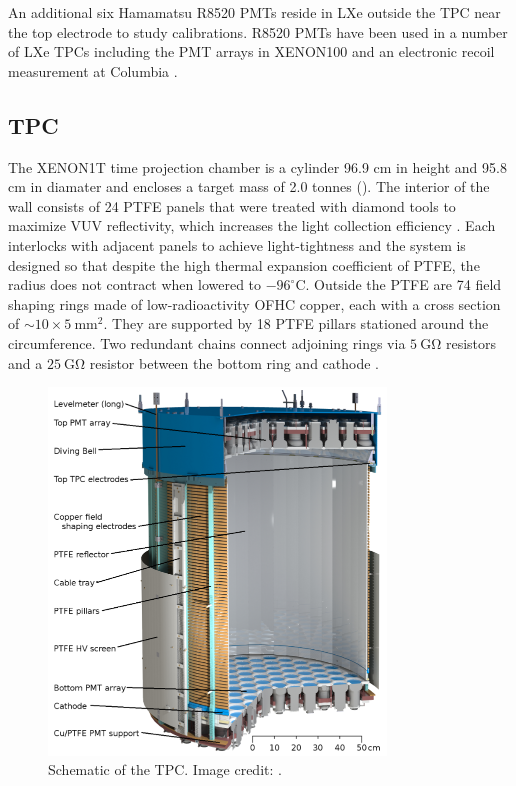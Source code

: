 An additional six Hamamatsu R8520 PMTs reside in LXe outside the TPC near the top electrode to study calibrations.  R8520 PMTs
have been used in a number of LXe TPCs including the PMT arrays in XENON100 and an electronic recoil measurement at
Columbia .




\subsection{TPC}
\label{subsec:xenon1t_tpc}
The XENON1T time projection chamber is a cylinder 96.9 cm in height and 95.8 cm in diamater and encloses a target mass of 2.0 tonnes
().  The interior of the wall consists of 24 PTFE panels that were treated with diamond tools to
maximize VUV reflectivity, which increases the light collection efficiency .  Each interlocks with adjacent panels
to achieve light-tightness and the system is designed so that despite the high thermal expansion coefficient of PTFE, the radius does not
contract when lowered to $-96^{\circ}\mathrm{C}$.  Outside the PTFE are 74
field shaping rings made of low-radioactivity OFHC copper, each with a cross section of ${\sim} 10 \times 5\ \mathrm{mm^{2}}$.  They are
supported by 18 PTFE pillars stationed around the circumference.  Two redundant
chains connect adjoining rings via $5\ \mathrm{G \Omega}$ resistors and a $25\ \mathrm{G \Omega}$ resistor between the bottom ring and
cathode .

\begin{figure}
\centering
\includegraphics[width=0.8\textwidth]{XENON1TTPC}
\caption{Schematic of the TPC.  Image credit: .}
\label{fig:xenon1t_tpc_tpc}
\end{figure}

